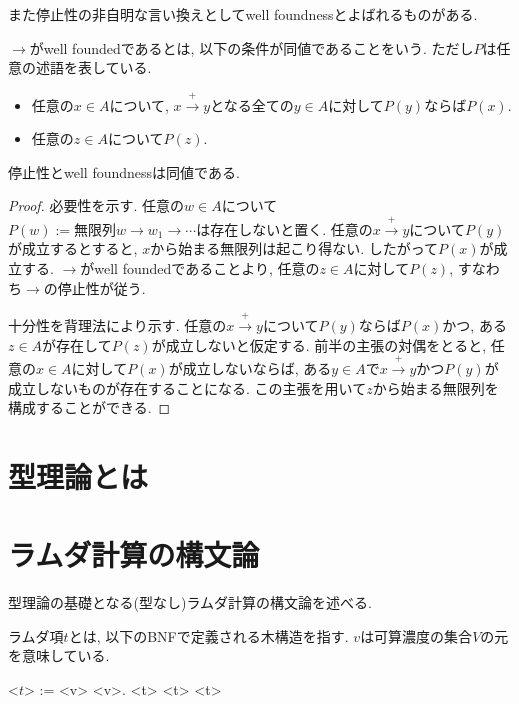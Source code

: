 \documentclass{ltjsarticle}
\begin{document}
また停止性の非自明な言い換えとしてwell foundnessとよばれるものがある.

\begin{defn}
$\rightarrow$がwell foundedであるとは, 以下の条件が同値であることをいう. ただし$P$は任意の述語を表している.
 \begin{itemize}
  \item 任意の$x \in A$について, $x \xrightarrow{+} y$となる全ての$y \in A$に対して$P(y)$ならば$P(x)$.
  \item 任意の$z \in A$について$P(z)$.
 \end{itemize}
\end{defn}

\begin{thm}
 停止性とwell foundnessは同値である.
\end{thm}

\begin{proof}
 必要性を示す. 任意の$w \in A$について$P(w):= \text{無限列} w \rightarrow w_1 \rightarrow \cdots \text{は存在しない}$と置く. 任意の$x \xrightarrow{+} y$について$P(y)$が成立するとすると, $x$から始まる無限列は起こり得ない. したがって$P(x)$が成立する. $\rightarrow$がwell foundedであることより, 任意の$z \in A$に対して$P(z)$, すなわち$\rightarrow$の停止性が従う.
 
 十分性を背理法により示す. 任意の$x \xrightarrow{+} y$について$P(y)$ならば$P(x)$かつ, ある$z \in A$が存在して$P(z)$が成立しないと仮定する. 前半の主張の対偶をとると, 任意の$x \in A$に対して$P(x)$が成立しないならば, ある$y \in A$で$x \xrightarrow{+} y$かつ$P(y)$が成立しないものが存在することになる. この主張を用いて$z$から始まる無限列を構成することができる.
\end{proof}

\section{型理論とは}

\section{ラムダ計算の構文論}
型理論の基礎となる(型なし)ラムダ計算の構文論を述べる.

\begin{defn}
 ラムダ項$t$とは, 以下のBNFで定義される木構造を指す. $v$は可算濃度の集合$V$の元を意味している.
\begin{grammar}
 <$t$> := <v> \alt \lambda <v>. <t> \alt <t> <t>
\end{grammar}
\end{defn}
\end{document}
